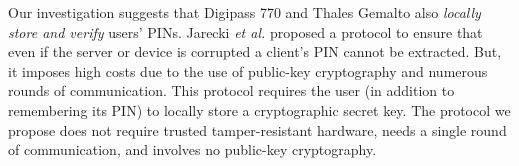 Our investigation suggests that Digipass 770 \cite{Digipass-website} and Thales Gemalto \cite{Gemalto} also \emph{locally store and verify} users' PINs. Jarecki \textit{et al.} \cite{JareckiJKSS21} proposed a protocol to ensure that even if the server or device is corrupted a client's PIN cannot be extracted. But, it imposes high costs due to the use of public-key cryptography and numerous rounds of communication. This protocol requires the user (in addition to remembering its PIN) to locally store a cryptographic secret key. The protocol we propose does not require trusted tamper-resistant hardware, needs a single round of communication, and involves no public-key cryptography.



